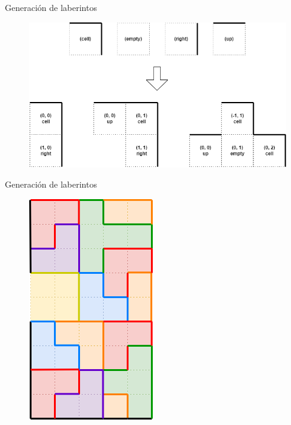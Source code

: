 \documentclass{beamer}
\begin{document}
    \begin{frame}{Generación de laberintos \scriptsize{\hfill \secname}}
        \begin{figure}[H]
        \centering
            \includegraphics[scale=0.4]{img/celdasYpiezas.png}
        \end{figure}
    \end{frame}
    
    \begin{frame}{Generación de laberintos \scriptsize{\hfill \secname}}
        \begin{figure}[H]
        \centering
            \includegraphics[scale=0.475]{img/grafo_color.png}
        \end{figure}
    \end{frame}
\end{document}

